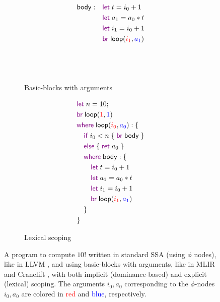 \documentclass[acmsmall,screen,review]{acmart}
\newcommand{\ms}[1]{\ensuremath{\mathsf{#1}}}
\newcommand{\kwms}[1]{\textcolor{violet}{\ms{#1}}}
\newcommand{\lbms}[1]{{\ms{#1}}}
\begin{document}
\begin{figure}
\begin{subfigure}[t]{.35\textwidth}
\begin{adjustbox}{minipage=1.2\textwidth,scale=0.8}
\begin{align*}
      \lbms{body}: \quad            & \kwms{let}\;t = i_0 + 1 \\
                                    & \kwms{let}\;a_1 = a_0 * t \\
                                    & \kwms{let}\;i_1 = i_0 + 1 \\
                                    & \kwms{br}\;\lbms{loop}
                                      (\textcolor{red}{i_1}, \textcolor{blue}{a_1}) 
                                    \\ \\ \\ \\
    \end{align*}
    \end{adjustbox}
    \caption{Basic-blocks with arguments}
    \label{fig:fact-bba}
  \end{subfigure}%
  \begin{subfigure}[t]{.3\textwidth}
    \begin{adjustbox}{minipage=\linewidth,scale=0.8}
    \begin{align*}
      & \kwms{let}\;n = 10; \\
      & \kwms{br}\;\lbms{loop}(\textcolor{red}{1}, \textcolor{blue}{1}) \\
      & \kwms{where}\;\lbms{loop}(\textcolor{red}{i_0}, \textcolor{blue}{a_0}): \{ \\
      & \quad \kwms{if}\;i_0 < n\;\{\;\kwms{br}\;\lbms{body}\;\} \\
      & \quad \kwms{else}\;\{\;\kwms{ret}\;a_0\;\} \\
      & \quad \kwms{where}\;\lbms{body}: \{\\ 
      & \qquad \kwms{let}\;t = i_0 + 1 \\
      & \qquad \kwms{let}\;a_1 = a_0 * t \\
      & \qquad \kwms{let}\;i_1 = i_0 + 1 \\
      & \qquad \kwms{br}\;\lbms{loop}(\textcolor{red}{i_1}, \textcolor{blue}{a_1})  \\
      & \quad \} \\
      & \}
    \end{align*}
    \end{adjustbox}
    \caption{Lexical scoping}
  \end{subfigure}
  
  \caption{%
    A program to compute $10!$ written in standard SSA (using $\phi$ nodes), like in LLVM
    \cite{llvm}, and using basic-blocks with arguments, like in MLIR \cite{mlir} and Cranelift
    \cite{cranelift}, with both implicit (dominance-based) and explicit (lexical) scoping. The
    arguments $i_0, a_0$ corresponding to the $\phi$-nodes $i_0, a_0$ are colored in
    \textcolor{red}{red} and \textcolor{blue}{blue}, respectively.%
  }
  \Description{}
\end{figure}
\end{document}
